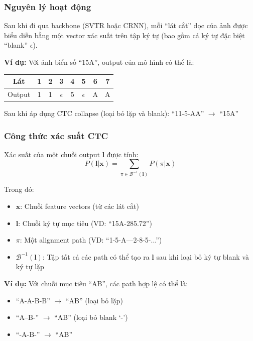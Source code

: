 \subsubsection{Nguyên lý hoạt động}
Sau khi đi qua backbone (SVTR hoặc CRNN), mỗi ``lát cắt'' dọc của ảnh được biểu diễn bằng một vector xác suất trên tập ký tự (bao gồm cả ký tự đặc biệt ``blank'' $\epsilon$).

\textbf{Ví dụ:} Với ảnh biển số ``15A'', output của mô hình có thể là:
\begin{center}
\begin{tabular}{|c|c|c|c|c|c|c|c|}
\hline
Lát & 1 & 2 & 3 & 4 & 5 & 6 & 7 \\ \hline
Output & 1 & 1 & $\epsilon$ & 5 & $\epsilon$ & A & A \\ \hline
\end{tabular}
\end{center}

Sau khi áp dụng CTC collapse (loại bỏ lặp và blank): ``11-5-AA'' $\rightarrow$ ``15A''

\subsubsection{Công thức xác suất CTC}
Xác suất của một chuỗi output $\mathbf{l}$ được tính:
\begin{equation}
    P(\mathbf{l} | \mathbf{x}) = \sum_{\pi \in \mathcal{B}^{-1}(\mathbf{l})} P(\pi | \mathbf{x})
\end{equation}

Trong đó:
\begin{itemize}
    \item $\mathbf{x}$: Chuỗi feature vectors (từ các lát cắt)
    \item $\mathbf{l}$: Chuỗi ký tự mục tiêu (VD: ``15A-285.72'')
    \item $\pi$: Một alignment path (VD: ``1-5-A---2-8-5-...'')
    \item $\mathcal{B}^{-1}(\mathbf{l})$: Tập tất cả các path có thể tạo ra $\mathbf{l}$ sau khi loại bỏ ký tự blank và ký tự lặp
\end{itemize}

\textbf{Ví dụ:} Với chuỗi mục tiêu ``AB'', các path hợp lệ có thể là:
\begin{itemize}
    \item ``A-A-B-B'' $\rightarrow$ ``AB'' (loại bỏ lặp)
    \item ``A--B-'' $\rightarrow$ ``AB'' (loại bỏ blank `-')
    \item ``-A-B-'' $\rightarrow$ ``AB''
\end{itemize}

